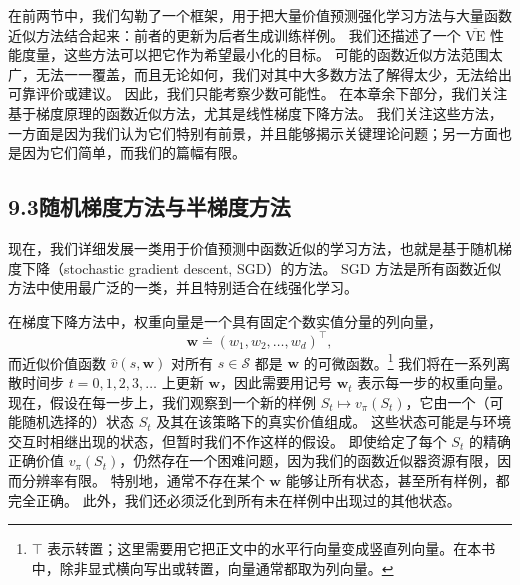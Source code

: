 \documentclass[UTF8,12pt,a4paper,fontset=fandol]{ctexart}
\begin{document}
在前两节中，我们勾勒了一个框架，用于把大量价值预测强化学习方法与大量函数近似方法结合起来：前者的更新为后者生成训练样例。
我们还描述了一个 $\overline{\mathrm{VE}}$ 性能度量，这些方法可以把它作为希望最小化的目标。
可能的函数近似方法范围太广，无法一一覆盖，而且无论如何，我们对其中大多数方法了解得太少，无法给出可靠评价或建议。
因此，我们只能考察少数可能性。
在本章余下部分，我们关注基于梯度原理的函数近似方法，尤其是线性梯度下降方法。
我们关注这些方法，一方面是因为我们认为它们特别有前景，并且能够揭示关键理论问题；另一方面也是因为它们简单，而我们的篇幅有限。

\subsection*{9.3\quad 随机梯度方法与半梯度方法}

现在，我们详细发展一类用于价值预测中函数近似的学习方法，也就是基于随机梯度下降（stochastic gradient descent, SGD）的方法。
SGD 方法是所有函数近似方法中使用最广泛的一类，并且特别适合在线强化学习。

在梯度下降方法中，权重向量是一个具有固定个数实值分量的列向量，
\[
\mathbf{w}\doteq (w_1,w_2,\ldots,w_d)^\top,
\]
而近似价值函数 $\hat{v}(s,\mathbf{w})$ 对所有 $s\in\mathcal{S}$ 都是 $\mathbf{w}$ 的可微函数。\footnote{$\top$ 表示转置；这里需要用它把正文中的水平行向量变成竖直列向量。在本书中，除非显式横向写出或转置，向量通常都取为列向量。}
我们将在一系列离散时间步 $t=0,1,2,3,\ldots$ 上更新 $\mathbf{w}$，因此需要用记号 $\mathbf{w}_t$ 表示每一步的权重向量。
现在，假设在每一步上，我们观察到一个新的样例 $S_t\mapsto v_\pi(S_t)$，它由一个（可能随机选择的）状态 $S_t$ 及其在该策略下的真实价值组成。
这些状态可能是与环境交互时相继出现的状态，但暂时我们不作这样的假设。
即使给定了每个 $S_t$ 的精确正确价值 $v_\pi(S_t)$，仍然存在一个困难问题，因为我们的函数近似器资源有限，因而分辨率有限。
特别地，通常不存在某个 $\mathbf{w}$ 能够让所有状态，甚至所有样例，都完全正确。
此外，我们还必须泛化到所有未在样例中出现过的其他状态。
\end{document}
